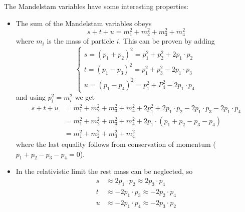 The Mandelstam variables have some interesting properties:
\begin{itemize}
\item The sum of the Mandelstam variables obeys
\[ s+t+u = m_1^2 + m_2^2 + m_3^2 + m_4^2 \]
where $m_i$ is the mass of particle $i$. This can be proven by adding
\[ \begin{cases}
s = (p_1 + p_2)^2 = p_1^2 + p_2^2 + 2p_1\cdot p_2 \\
t = (p_1 - p_3)^2 = p_1^2 + p_3^2 - 2p_1\cdot p_3\\
u = (p_1 - p_4)^2 = p_1^2 + P_4^2 - 2p_1\cdot p_4
\end{cases} \]
and using $p_i^2 = m_i^2$ we get
\begin{align*}
s+t+u &= m_1^2 + m_2^2 + m_3^2 + m_4^2 + 2p_1^2 + 2p_1\cdot p_2 - 2p_1\cdot p_3 - 2p_1\cdot p_4 \\
&= m_1^2 + m_2^2 + m_3^2 + m_4^2 + 2p_1\cdot (p_1 + p_2 - p_3 - p_4) \\
&= m_1^2 + m_2^2 + m_3^2 + m_4^2
\end{align*}
where the last equality follows from conservation of momentum ($p_1 + p_2 - p_3 - p_4 = 0$).
\item In the relativistic limit the rest mass can be neglected, so
\begin{align*}
s &\approx 2p_1\cdot p_2 \approx 2p_3\cdot p_4 \\
t &\approx -2p_1\cdot p_3 \approx -2p_2\cdot p_4 \\
u &\approx -2p_1\cdot p_4 \approx -2p_3\cdot p_2 \\
\end{align*}
\end{itemize}

